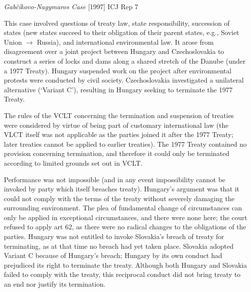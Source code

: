 \begin{casedetails}{\textit{Gabčíkovo-Nagymaros Case} [1997] ICJ Rep 7}
    \flushleft

    This case involved questions of treaty law, state responsibility, succession of states (new states succeed to their obligation of their parent states, e.g., Soviet Union $\rightarrow$ Russia), and international environmental law. It arose from disagreement over a joint project between Hungary and Czechoslovakia to construct a series of locks and dams along a shared stretch of the Danube (under a 1977 Treaty). Hungary suspended work on the project after environmental protests were conducted by civil society. Czechoslovakia investigated a unilateral alternative (`Variant C'), resulting in Hungary seeking to terminate the 1977 Treaty.

    \vspace{\baselineskip}
    
    The rules of the VCLT concerning the termination and suspension of treaties were considered by virtue of being part of customary international law (the VLCT itself was not applicable as the parties joined it after the 1977 Treaty; later treaties cannot be applied to earlier treaties). The 1977 Treaty contained no provision concerning termination, and therefore it could only be terminated according to limited grounds set out in VCLT. 
    
    \vspace{\baselineskip}
    
    Performance was not impossible (and in any event impossibility cannot be invoked by party which itself breaches treaty). Hungary's argument was that it could not comply with the terms of the treaty without severely damaging the surrounding environment. The plea of fundamental change of circumstances can only be applied in exceptional circumstances, and there were none here; the court refused to apply art 62, as there were no radical changes to the obligations of the parties. Hungary was not entitled to invoke Slovakia's breach of treaty for terminating, as at that time no breach had yet taken place. Slovakia adopted Variant C because of Hungary's breach; Hungary by its own conduct had prejudiced its right to terminate the treaty. Although both Hungary and Slovakia failed to comply with the treaty, this reciprocal conduct did not bring treaty to an end nor justify its termination.

    \vspace{\baselineskip}


\end{casedetails}
